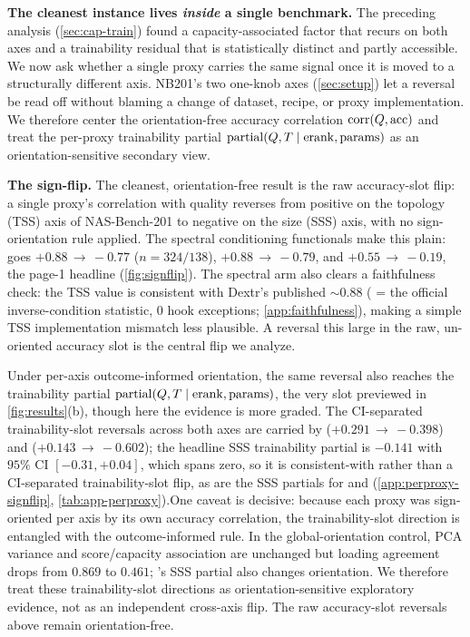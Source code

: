 \noindent\textbf{The cleanest instance lives \emph{inside} a single benchmark.}
The preceding analysis (\cref{sec:cap-train}) found a capacity-associated factor
that recurs on both axes
and a trainability residual that is statistically distinct and partly accessible. We
now ask whether a single proxy carries the same signal once it is moved to a
structurally different axis. NB201's two one-knob axes (\cref{sec:setup}) let a
reversal be read off without blaming a change of dataset, recipe, or proxy
implementation. We therefore center the orientation-free accuracy correlation
$\operatorname{corr}(Q,\mathrm{acc})$ and treat the per-proxy trainability partial
$\operatorname{partial}(Q,T\mid\operatorname{erank},\mathrm{params})$ as an orientation-sensitive secondary view.

\noindent\textbf{The sign-flip.}\label{sec:result4}\label{sec:r4}\label{sec:signflip}\label{find:flip}{}
The cleanest, orientation-free result is the raw accuracy-slot flip: a single
proxy's correlation with quality reverses from positive on the topology
(TSS) axis of NAS-Bench-201 to negative on the size (SSS) axis, with no
sign-orientation rule applied. The spectral conditioning functionals make this
plain:  goes $+0.88\,{\to}\,-0.77$ ($n{=}324/138$),
 $+0.88\,{\to}\,-0.79$, and  $+0.55\,{\to}\,-0.19$, the page-1
headline (\cref{fig:signflip}). The spectral arm also clears a faithfulness
check: the TSS value is consistent with Dextr's published $\sim\!0.88$
( = the official inverse-condition statistic, $0$ hook exceptions;
\cref{app:faithfulness}), making a simple TSS implementation mismatch less
plausible. A
reversal this large in the raw, un-oriented accuracy slot is the central flip we
analyze.

\noindent Under per-axis outcome-informed orientation, the same reversal also reaches the trainability partial
$\operatorname{partial}(Q,T\mid\operatorname{erank},\mathrm{params})$, the very slot previewed in
\cref{fig:results}(b), though here the evidence is more graded. The CI-separated
trainability-slot reversals across both axes are carried by 
($+0.291\,{\to}\,-0.398$) and  ($+0.143\,{\to}\,-0.602$); the
headline  SSS trainability partial is $-0.141$ with $95\%$ CI
$[-0.31,+0.04]$, which spans zero, so it is consistent-with rather than a
CI-separated trainability-slot flip, as are the SSS partials for 
and  (\cref{app:perproxy-signflip}, \cref{tab:app-perproxy}).\linebreak One
caveat is decisive: because each proxy was sign-oriented per axis by its own
accuracy correlation, the trainability-slot direction is entangled with the
outcome-informed rule. In the global-orientation control, PCA variance and
score/capacity association are unchanged but loading agreement drops from
$0.869$ to $0.461$; 's SSS partial also changes orientation. We therefore
treat these trainability-slot directions as orientation-sensitive exploratory
evidence, not as an independent cross-axis flip. The raw accuracy-slot reversals
above remain orientation-free.

